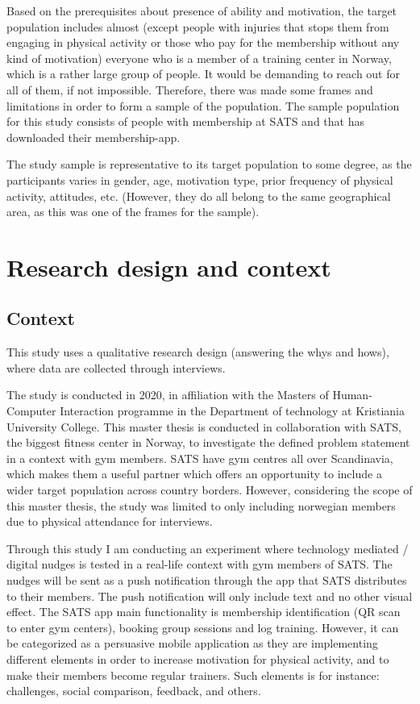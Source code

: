 
Based on the prerequisites about presence of ability and motivation, the target population includes almost (except people with injuries that stops them from engaging in physical activity or those who pay for the membership without any kind of motivation) everyone who is a member of a training center in Norway, which is a rather large group of people. It would be demanding to reach out for all of them, if not impossible. Therefore, there was made some frames and limitations in order to form a sample of the population. The sample population for this study consists of people with membership at SATS and that has downloaded their membership-app. 
 
 The study sample is representative to its target population to some degree, as the participants varies in gender, age, motivation type, prior frequency of physical activity, attitudes, etc. (However, they do all belong to the same geographical area, as this was one of the frames for the sample).
 
\section{Research design and context}
\subsection{Context}
This study uses a qualitative research design (answering the whys and hows), where data are collected through interviews. 

The study is conducted in 2020, in affiliation with the Masters of Human-Computer Interaction programme in the Department of technology at Kristiania University College. This master thesis is conducted in collaboration with SATS, the biggest fitness center in Norway, to investigate the defined problem statement in a context with gym members. SATS have gym centres all over Scandinavia, which makes them a useful partner which offers an opportunity to include a wider target population across country borders. However, considering the scope of this master thesis, the study was limited to only including norwegian members due to physical attendance for interviews. 

Through this study I am conducting an experiment where technology mediated / digital nudges is tested in a real-life context with gym members of SATS. The nudges will be sent as a push notification through the app that SATS distributes to their members. The push notification will only include text and no other visual effect. The SATS app main functionality is membership identification (QR scan to enter gym centers), booking group sessions and log training. However, it can be categorized as a persuasive mobile application as they are implementing different elements in order to increase motivation for physical activity, and to make their members become regular trainers. Such elements is for instance: challenges, social comparison, feedback, and others. 

